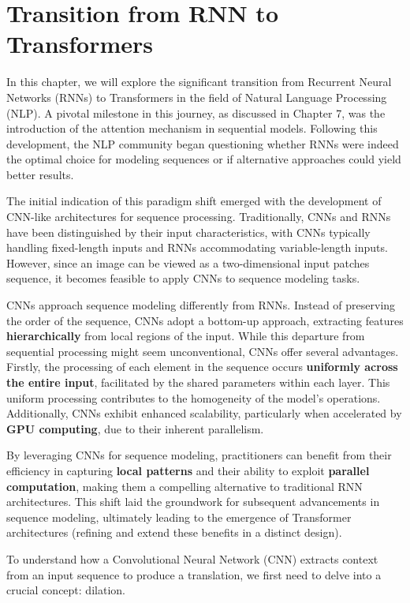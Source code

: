 \section{Transition from RNN to Transformers}
In this chapter, we will explore the significant transition from Recurrent Neural Networks (RNNs) to Transformers in the field of Natural Language Processing (NLP). A pivotal milestone in this journey, as discussed in Chapter 7, was the introduction of the attention mechanism in sequential models. Following this development, the NLP community began questioning whether RNNs were indeed the optimal choice for modeling sequences or if alternative approaches could yield better results.


The initial indication of this paradigm shift emerged with the development of CNN-like architectures for sequence processing. Traditionally, CNNs and RNNs have been distinguished by their input characteristics, with CNNs typically handling fixed-length inputs and RNNs accommodating variable-length inputs. However, since an image can be viewed as a two-dimensional input patches sequence, it becomes feasible to apply CNNs to sequence modeling tasks.


CNNs approach sequence modeling differently from RNNs. Instead of preserving the order of the sequence, CNNs adopt a bottom-up approach, extracting features \textbf{hierarchically} from local regions of the input. While this departure from sequential processing might seem unconventional, CNNs offer several advantages. Firstly, the processing of each element in the sequence occurs \textbf{uniformly across the entire input}, facilitated by the shared parameters within each layer. This uniform processing contributes to the homogeneity of the model's operations. Additionally, CNNs exhibit enhanced scalability, particularly when accelerated by \textbf{GPU computing}, due to their inherent parallelism.

By leveraging CNNs for sequence modeling, practitioners can benefit from their efficiency in capturing \textbf{local patterns} and their ability to exploit \textbf{parallel computation}, making them a compelling alternative to traditional RNN architectures. This shift laid the groundwork for subsequent advancements in sequence modeling, ultimately leading to the emergence of Transformer architectures (refining and extend these benefits in a distinct design).

To understand how a Convolutional Neural Network (CNN) extracts context from an input sequence to produce a translation, we first need to delve into a crucial concept: dilation.

